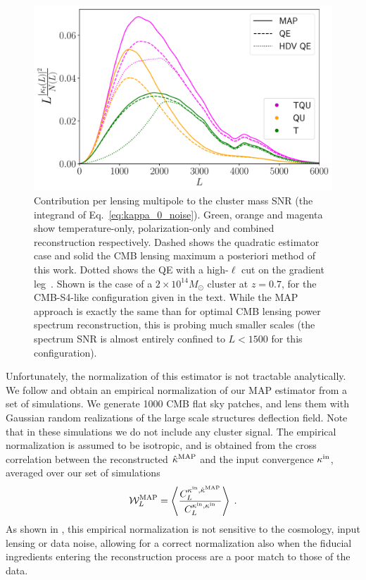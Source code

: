 \documentclass[prd, superscriptaddress, tightenlines, longbibliography, nofootinbib, eqsecnum, amsfonts, amsmath, floatfix, twocolumn, notitlepage]{revtex4-2}
\begin{document}
\begin{figure}
	\centering
	\hspace*{-1.0cm}
	\includegraphics[width=1.\hsize]{Figures/Integrand_ver2.pdf}
	\caption{Contribution per lensing multipole to the cluster mass SNR (the integrand of Eq.~\ref{eq:kappa_0_noise}). Green, orange and magenta show temperature-only, polarization-only and combined reconstruction respectively. Dashed shows the quadratic estimator case and solid the CMB lensing maximum a posteriori method of this work. Dotted shows the QE with a high-$\ell$ cut on the gradient leg~\cite{Hu:2007bt}. Shown is the case of a $2\times 10^{14} M_\odot$ cluster at $z = 0.7$, for the CMB-S4-like configuration given in the text. While the MAP approach is exactly the same than for optimal CMB lensing power spectrum reconstruction, this is probing much smaller scales (the spectrum SNR is almost entirely confined to $L < 1500$ for this configuration).}
	\label{fig:int}
\end{figure}

Unfortunately, the normalization of this estimator is not tractable analytically. We follow \cite{Legrand:2021qdu,Legrand:2023jne} and obtain an empirical normalization of our MAP estimator from a set of simulations.
We generate 1000 CMB flat sky patches, and lens them with Gaussian random realizations of the large scale structures deflection field. Note that in these simulations we do not include any cluster signal. The empirical normalization is assumed to be isotropic, and is obtained from the cross correlation between the reconstructed $\hat \kappa^{\rm MAP}$ and the input convergence $\kappa^{\rm in}$, averaged over our set of simulations
\begin{equation}
    \mathcal{W}^{\rm MAP}_L = \left< \frac{C_L^{\kappa^{\rm in}, \hat \kappa^{\rm MAP}}}{C_L^{\kappa^{\rm in}, \kappa^{\rm in}}} \right> \; .
\end{equation}
As shown in \cite{Legrand:2021qdu,Legrand:2023jne}, this empirical normalization is not sensitive to the cosmology, input lensing or data noise, allowing for a correct normalization also when the fiducial ingredients entering the reconstruction process are a poor match to those of the data.
\end{document}
